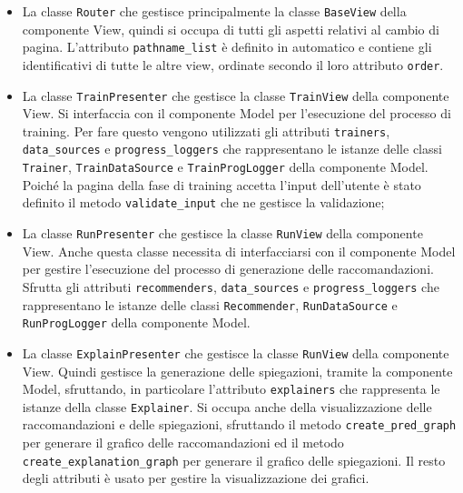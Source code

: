 \begin{itemize}
\item La classe \texttt{Router} che gestisce principalmente la classe \texttt{BaseView} della componente View, quindi si occupa di tutti gli aspetti relativi al cambio di pagina. L'attributo \texttt{pathname\_list} è definito in automatico e contiene gli identificativi di tutte le altre view, ordinate secondo il loro attributo \texttt{order}.

\item La classe \texttt{TrainPresenter} che gestisce la classe \texttt{TrainView} della componente View. Si interfaccia con il componente Model per l'esecuzione del processo di training. Per fare questo vengono utilizzati gli attributi \texttt{trainers}, \texttt{data\_sources} e \texttt{progress\_loggers} che rappresentano le istanze delle classi \texttt{Trainer}, \texttt{TrainDataSource} e \texttt{TrainProgLogger} della componente Model. Poiché la pagina della fase di training accetta l'input dell'utente è stato definito il metodo \texttt{validate\_input} che ne gestisce la validazione;

\item La classe \texttt{RunPresenter} che gestisce la classe \texttt{RunView} della componente View. Anche questa classe necessita di interfacciarsi con il componente Model per gestire l'esecuzione del processo di generazione delle raccomandazioni. Sfrutta gli attributi \texttt{recommenders}, \texttt{data\_sources} e \texttt{progress\_loggers} che rappresentano le istanze delle classi \texttt{Recommender}, \texttt{RunDataSource} e \texttt{RunProgLogger} della componente Model.

\item La classe \texttt{ExplainPresenter} che gestisce la classe \texttt{RunView} della componente View. Quindi gestisce la generazione delle spiegazioni, tramite la componente Model, sfruttando, in particolare l'attributo \texttt{explainers} che rappresenta le istanze della classe \texttt{Explainer}. Si occupa anche della visualizzazione delle raccomandazioni e delle spiegazioni, sfruttando il metodo \texttt{create\_pred\_graph} per generare il grafico delle raccomandazioni ed il metodo \texttt{create\_explanation\_graph} per generare il grafico delle spiegazioni. Il resto degli attributi è usato per gestire la visualizzazione dei grafici.

\end{itemize}












 







